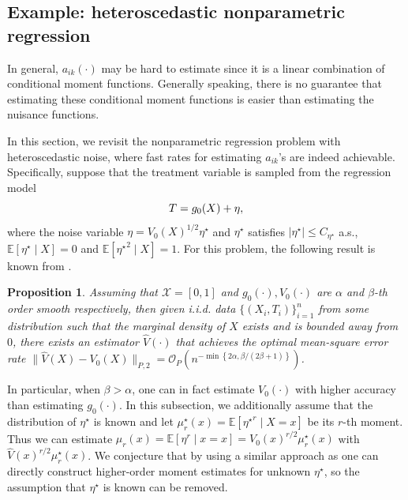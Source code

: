 \documentclass{article}
\def\gO{{\mathcal{O}}}
\def\gX{{\mathcal{X}}}
\newcommand{\E}{\mathbb{E}}
\newtheorem{proposition}{Proposition}[section]
\begin{document}
%

\subsection{Example: heteroscedastic nonparametric regression}
\label{subsec:heteroscedastic}

In general, $a_{ik}(\cdot)$ may be hard to estimate since it is a linear combination of conditional moment functions. Generally speaking, there is no guarantee that estimating these conditional moment functions is easier than estimating the nuisance functions. 

In this section, we revisit the nonparametric regression problem with heteroscedastic noise, where fast rates for estimating $a_{ik}$'s are indeed achievable. Specifically, suppose that the treatment variable is sampled from the regression model
\begin{equation}
    \notag
    T = g_0(X) + \eta,
\end{equation}
where the noise variable $\eta=V_0(X)^{1/2}\eta^{\star}$ and $\eta^{\star}$ satisfies $|\eta^{\star}|\leq C_{\eta^{\star}}$ a.s., $\E[\eta^{\star}\mid X]=0$ and $\E[{\eta^{\star}}^2\mid X]=1$. For this problem, the following result is known from \citet{wang2008effect}.

\begin{proposition}
\label{thm:optimal-variance-estimate}
    \citep[Theorems 1,2 and Remark 3]{wang2008effect}
    Assuming that $\gX=[0,1]$ and $g_0(\cdot),V_0(\cdot)$ are $\alpha$ and $\beta$-th order smooth respectively, then given i.i.d. data $\{(X_i,T_i)\}_{i=1}^n$ from some distribution such that the marginal density of $X$ exists and is bounded away from $0$, there exists an estimator $\hat{V}(\cdot)$ that achieves the optimal mean-square error rate $\|\hat{V}(X)-V_0(X)\|_{P,2} = \gO_P\left(n^{-\min\left\{2\alpha,\beta/(2\beta+1)\right\}}\right)$.
\end{proposition}

In particular, when $\beta>\alpha$, one can in fact estimate $V_0(\cdot)$ with higher accuracy than estimating $g_0(\cdot)$. In this subsection, we additionally assume that the distribution of $\eta^{\star}$ is known and let $\mu_r^{\star}(x)=\E[{\eta^{\star}}^r\mid X=x]$ be its $r$-th moment. Thus we can estimate $\mu_r(x)=\E[\eta^r\mid x=x]=V_0(x)^{r/2}\mu_r^{\star}(x)$ with $\hat{V}(x)^{r/2}\mu_r^{\star}(x)$. We conjecture that by using a similar approach as \citet{wang2008effect} one can directly construct higher-order moment estimates for unknown $\eta^{\star}$, so the assumption that $\eta^{\star}$ is known can be removed.
\end{document}
